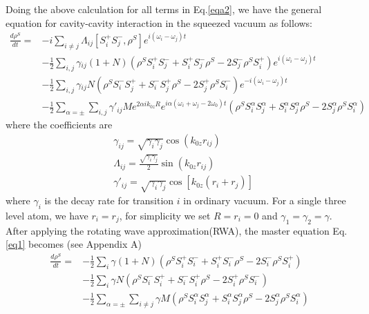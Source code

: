 \documentclass[aps,showpacs,onecolumn,twoside,groupedaddress]{revtex4}
\begin{document}
Doing the above calculation for all terms in Eq.\eqref{eqa2}, we have the general equation for cavity-cavity interaction in the squeezed vacuum as follows:
\begin{equation}
\label{eq1}
\begin{split}
\frac{d\rho^{S}}{dt}=&-i\underset{i\neq j}{\sum}\Lambda_{ij}[S_{i}^{+}S_{j}^{-},\rho^{S}]e^{i(\omega_{i}-\omega_{j})t}\\
&-\frac{1}{2}\underset{i,j}{\sum}\gamma{}_{ij}(1+N)(\rho^{S}S_{i}^{+}S_{j}^{-}+S_{i}^{+}S_{j}^{-}\rho^{S}-2S_{j}^{-}\rho^{S}S_{i}^{+})e^{i(\omega_{i}-\omega_{j})t} \\
&-\frac{1}{2}\underset{i,j}{\sum}\gamma{}_{ij}N(\rho^{S}S_{i}^{-}S_{j}^{+}+S_{i}^{-}S_{j}^{+}\rho^{S}-2S_{j}^{+}\rho^{S}S_{i}^{-})e^{-i(\omega_{i}-\omega_{j})t}\\
&-\frac{1}{2}\sum_{\alpha=\pm}\underset{i,j}{\sum}\gamma'_{ij}Me^{2\alpha ik_{0z}R}e^{i\alpha(\omega_i+\omega_j-2\omega_0)t}(\rho^{S}S_{i}^{\alpha}S_{j}^{\alpha}+S_{i}^{\alpha}S_{j}^{\alpha}\rho^{S}-2S_{j}^{\alpha}\rho^{S}S_{i}^{\alpha})
\end{split}
\end{equation}
where the coefficients are
\begin{equation}
\label{eq2}
\begin{split}
& \gamma_{ij}=\sqrt{\gamma_{i}\gamma_{j}}\cos(k_{0z}r_{ij}) \\
& \Lambda_{ij}=\frac{\sqrt{\gamma_{i}\gamma_{j}}}{2}\sin(k_{0z}r_{ij})\\
& \gamma'_{ij}=\sqrt{\gamma_{i}\gamma_{j}}\cos[k_{0z}(r_{i}+r_{j})]
\end{split}
\end{equation}
where $\gamma_{i}$ is the decay rate for transition $i$ in ordinary vacuum. For a single three level atom, we have $r_i=r_j$, for simplicity we set $R=r_i=0$ and $\gamma_1=\gamma_2=\gamma$. After applying the rotating wave approximation(RWA), the master equation Eq.\eqref{eq1} becomes (see Appendix A)
\begin{equation}
\label{eq3}
\begin{split}
\frac{d\rho^{S}}{dt}=&-\frac{1}{2}\underset{i}{\sum}\gamma(1+N)(\rho^{S}S_{i}^{+}S_{i}^{-}+S_{i}^{+}S_{i}^{-}\rho^{S}-2S_{i}^{-}\rho^{S}S_{i}^{+})\\
&-\frac{1}{2}\underset{i}{\sum}\gamma N(\rho^{S}S_{i}^{-}S_{i}^{+}+S_{i}^{-}S_{i}^{+}\rho^{S}-2S_{i}^{+}\rho^{S}S_{i}^{-})\\
&-\frac{1}{2}\sum_{\alpha=\pm}\underset{i\ne j}{\sum}\gamma M(\rho^{S}S_{i}^{\alpha}S_{j}^{\alpha}+S_{i}^{\alpha}S_{j}^{\alpha}\rho^{S}-2S_{j}^{\alpha}\rho^{S}S_{i}^{\alpha})
\end{split}
\end{equation}
\end{document}
